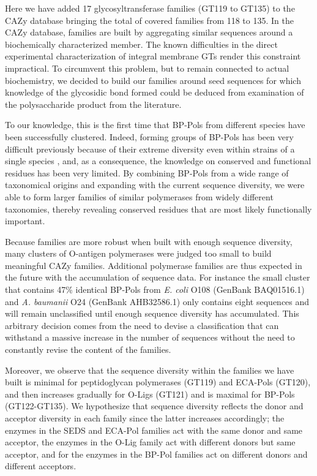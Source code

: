 \documentclass{article}
\begin{document}
Here we have added 17 glycosyltransferase families (GT119 to GT135) to the CAZy database bringing the total of covered families from 118 to 135. In the CAZy database, families are built by aggregating similar sequences around a biochemically characterized member. The known difficulties in the direct experimental characterization of integral membrane GTs render this constraint impractical. To circumvent this problem, but to remain connected to actual biochemistry, we decided to build our families around seed sequences for which knowledge of the glycosidic bond formed could be deduced from examination of the polysaccharide product from the literature.

To our knowledge, this is the first time that BP-Pols from different species have been successfully clustered. Indeed, forming groups of BP-Pols has been very difficult previously because of their extreme diversity even within strains of a single species \cite{iguchi_complete_2015}, and, as a consequence, the knowledge on conserved and functional residues has been very limited. By combining BP-Pols from a wide range of taxonomical origins and expanding with the current sequence diversity, we were able to form larger families of similar polymerases from widely different taxonomies, thereby revealing conserved residues that are most likely functionally important. 

Because families are more robust when built with enough sequence diversity, many clusters of O-antigen polymerases were judged too small to build meaningful CAZy families. Additional polymerase families are thus expected in the future with the accumulation of sequence data. For instance the small cluster that contains  47\% identical BP-Pols from \textit{E. coli} O108 (GenBank BAQ01516.1) and \textit{A. baumanii} O24 (GenBank AHB32586.1) only contains eight sequences and will remain unclassified until enough sequence diversity has accumulated. This arbitrary decision comes from the need to devise a classification that can withstand a massive increase in the number of sequences without the need to constantly revise the content of the families.

Moreover, we observe that the sequence diversity within the families we have built is minimal for peptidoglycan polymerases (GT119) and ECA-Pols (GT120), and then increases gradually for O-Ligs (GT121) and is maximal for BP-Pols (GT122-GT135). We hypothesize that sequence diversity reflects the donor and acceptor diversity in each family since the latter increases accordingly; the enzymes in the SEDS and ECA-Pol families act with the same donor and same acceptor, the enzymes in the O-Lig family act with different donors but same acceptor, and for the enzymes in the BP-Pol families act on different donors and different acceptors.
\end{document}
